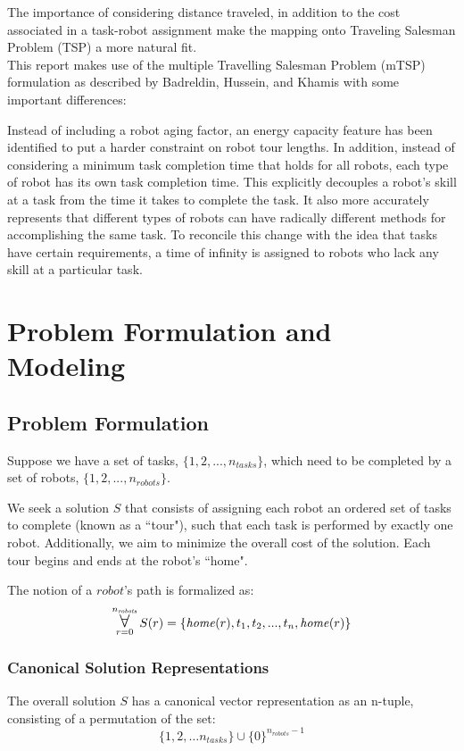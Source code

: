 \documentclass[a4paper]{article}
\newcommand\Forall{\mathop{\mbox{\Large $\mathsurround0pt\forall$}}}
\begin{document}
The importance of considering distance traveled, in addition to the cost associated in a task-robot assignment make the mapping onto Traveling Salesman Problem (TSP) a more natural fit.\\

This report makes use of the multiple Travelling Salesman Problem (mTSP) formulation as described by Badreldin, Hussein, and Khamis with some important differences:\cite{Badreldin}

Instead of including a robot aging factor, an energy capacity feature has been identified to put a harder constraint on robot tour lengths. In addition, instead of considering a minimum task completion time that holds for all robots, each type of robot has its own task completion time. This explicitly decouples a robot's skill at a task from the time it takes to complete the task. It also more accurately represents that different types of robots can have radically different methods for accomplishing the same task. To reconcile this change with the idea that tasks have certain requirements, a time of infinity is assigned to robots who lack any skill at a particular task.

\newpage
\section{Problem Formulation and Modeling}

\subsection{Problem Formulation}

Suppose we have a set of tasks, $\{1, 2, ..., n_\mathit{tasks}\}$, which need to be completed by a set of robots, $\{1, 2, ..., n_\mathit{robots}\}$.

We seek a solution $S$ that consists of assigning each robot an ordered set of tasks to complete (known as a ``tour"), such that each task is performed by exactly one robot. Additionally, we aim to minimize the overall cost of the solution. Each tour begins and ends at the robot's ``home".

The notion of a $robot$'s path is formalized as:
$$
\Forall_{r=0}^{n_\mathit{robots}}
S(r) = \{ \mathit{home}(r), t_1, t_2, ..., t_n, \mathit{home}(r) \}
$$

\subsubsection{Canonical Solution Representations}
The overall solution $S$ has a canonical vector representation as an n-tuple, consisting of a permutation of the set:
$$
\{1, 2, \dots n_{tasks}\} \cup \{0\}^{n_{robots}-1}
$$
\end{document}
